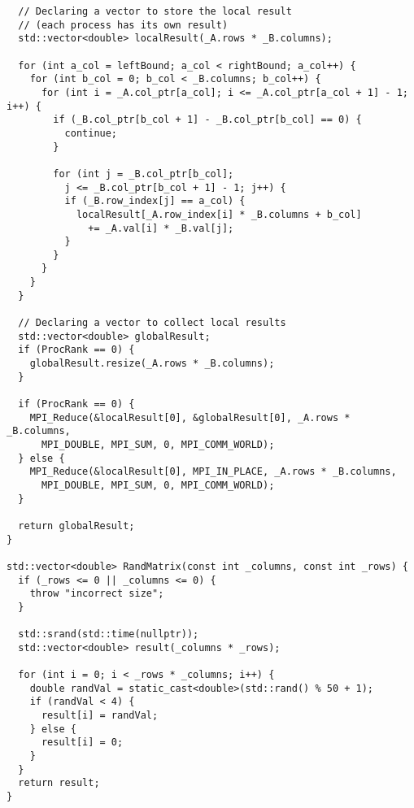 \documentclass[12pt,a4paper]{article}
\begin{document}
\begin{lstlisting}
  // Declaring a vector to store the local result
  // (each process has its own result)
  std::vector<double> localResult(_A.rows * _B.columns);

  for (int a_col = leftBound; a_col < rightBound; a_col++) {
    for (int b_col = 0; b_col < _B.columns; b_col++) {
      for (int i = _A.col_ptr[a_col]; i <= _A.col_ptr[a_col + 1] - 1; i++) {
        if (_B.col_ptr[b_col + 1] - _B.col_ptr[b_col] == 0) {
          continue;
        }

        for (int j = _B.col_ptr[b_col];
          j <= _B.col_ptr[b_col + 1] - 1; j++) {
          if (_B.row_index[j] == a_col) {
            localResult[_A.row_index[i] * _B.columns + b_col]
              += _A.val[i] * _B.val[j];
          }
        }
      }
    }
  }

  // Declaring a vector to collect local results
  std::vector<double> globalResult;
  if (ProcRank == 0) {
    globalResult.resize(_A.rows * _B.columns);
  }

  if (ProcRank == 0) {
    MPI_Reduce(&localResult[0], &globalResult[0], _A.rows * _B.columns,
      MPI_DOUBLE, MPI_SUM, 0, MPI_COMM_WORLD);
  } else {
    MPI_Reduce(&localResult[0], MPI_IN_PLACE, _A.rows * _B.columns,
      MPI_DOUBLE, MPI_SUM, 0, MPI_COMM_WORLD);
  }

  return globalResult;
}

std::vector<double> RandMatrix(const int _columns, const int _rows) {
  if (_rows <= 0 || _columns <= 0) {
    throw "incorrect size";
  }

  std::srand(std::time(nullptr));
  std::vector<double> result(_columns * _rows);

  for (int i = 0; i < _rows * _columns; i++) {
    double randVal = static_cast<double>(std::rand() % 50 + 1);
    if (randVal < 4) {
      result[i] = randVal;
    } else {
      result[i] = 0;
    }
  }
  return result;
}
\end{lstlisting}
\end{document}
